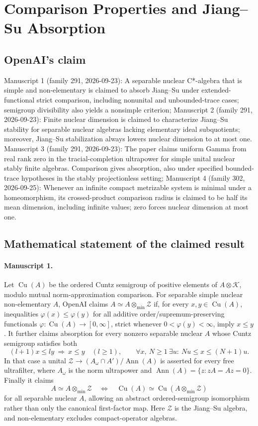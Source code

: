 \documentclass[11pt]{article}
\begin{document}
\section*{Comparison Properties and Jiang–Su Absorption}

\subsection{OpenAI's claim}
Manuscript 1 (family 291, 2026-09-23): A separable nuclear C*-algebra that is simple and non-elementary is claimed to absorb Jiang--Su under extended-functional strict comparison, including nonunital and unbounded-trace cases; semigroup divisibility also yields a nonsimple criterion; Manuscript 2 (family 291, 2026-09-23): Finite nuclear dimension is claimed to characterize Jiang--Su stability for separable nuclear algebras lacking elementary ideal subquotients; moreover, Jiang--Su stabilization always lowers nuclear dimension to at most one. Manuscript 3 (family 291, 2026-09-23): The paper claims uniform Gamma from real rank zero in the tracial-completion ultrapower for simple unital nuclear stably finite algebras. Comparison gives absorption, also under specified bounded-trace hypotheses in the stably projectionless setting; Manuscript 4 (family 302, 2026-09-25): Whenever an infinite compact metrizable system is minimal under a homeomorphism, its crossed-product comparison radius is claimed to be half its mean dimension, including infinite values; zero forces nuclear dimension at most one.

\subsection{Mathematical statement of the claimed result}
\paragraph{Manuscript 1.}
Let $\operatorname{Cu}(A)$ be the ordered Cuntz semigroup of positive elements of $A\otimes\mathcal K$, modulo mutual norm-approximation comparison. For separable simple nuclear non-elementary $A$, OpenAI claims $A\simeq A\otimes_{\min}\mathcal Z$ if, for every $x,y\in\operatorname{Cu}(A)$, inequalities $\varphi(x)\le\varphi(y)$ for all additive order/supremum-preserving functionals $\varphi:\operatorname{Cu}(A)\to[0,\infty]$, strict whenever $0<\varphi(y)<\infty$, imply $x\le y$.
It further claims absorption for every nonzero separable nuclear $A$ whose Cuntz semigroup satisfies both
\[
(l+1)x\le ly\ \Longrightarrow\ x\le y\quad(l\ge1),\qquad
\forall x,\ N\ge1\ \exists u:\ Nu\le x\le(N+1)u.
\]
In that case a unital $\mathcal Z\to (A_\omega\cap A')/\operatorname{Ann}(A)$ is asserted for every free ultrafilter, where $A_\omega$ is the norm ultrapower and $\operatorname{Ann}(A)=\{z:zA=Az=0\}$. Finally it claims
\[
A\simeq A\otimes_{\min}\mathcal Z\quad\Longleftrightarrow\quad
\operatorname{Cu}(A)\simeq\operatorname{Cu}(A\otimes_{\min}\mathcal Z)
\]
for all separable nuclear $A$, allowing an abstract ordered-semigroup isomorphism rather than only the canonical first-factor map. Here $\mathcal Z$ is the Jiang--Su algebra, and non-elementary excludes compact-operator algebras.
\end{document}
